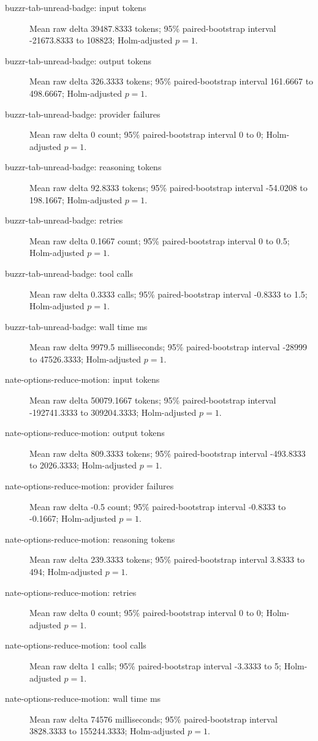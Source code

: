 \begin{description}
\item[buzzr-tab-unread-badge: input tokens] Mean raw delta 39487.8333 tokens; 95\% paired-bootstrap interval -21673.8333 to 108823; Holm-adjusted $p=1$.
\item[buzzr-tab-unread-badge: output tokens] Mean raw delta 326.3333 tokens; 95\% paired-bootstrap interval 161.6667 to 498.6667; Holm-adjusted $p=1$.
\item[buzzr-tab-unread-badge: provider failures] Mean raw delta 0 count; 95\% paired-bootstrap interval 0 to 0; Holm-adjusted $p=1$.
\item[buzzr-tab-unread-badge: reasoning tokens] Mean raw delta 92.8333 tokens; 95\% paired-bootstrap interval -54.0208 to 198.1667; Holm-adjusted $p=1$.
\item[buzzr-tab-unread-badge: retries] Mean raw delta 0.1667 count; 95\% paired-bootstrap interval 0 to 0.5; Holm-adjusted $p=1$.
\item[buzzr-tab-unread-badge: tool calls] Mean raw delta 0.3333 calls; 95\% paired-bootstrap interval -0.8333 to 1.5; Holm-adjusted $p=1$.
\item[buzzr-tab-unread-badge: wall time ms] Mean raw delta 9979.5 milliseconds; 95\% paired-bootstrap interval -28999 to 47526.3333; Holm-adjusted $p=1$.
\item[nate-options-reduce-motion: input tokens] Mean raw delta 50079.1667 tokens; 95\% paired-bootstrap interval -192741.3333 to 309204.3333; Holm-adjusted $p=1$.
\item[nate-options-reduce-motion: output tokens] Mean raw delta 809.3333 tokens; 95\% paired-bootstrap interval -493.8333 to 2026.3333; Holm-adjusted $p=1$.
\item[nate-options-reduce-motion: provider failures] Mean raw delta -0.5 count; 95\% paired-bootstrap interval -0.8333 to -0.1667; Holm-adjusted $p=1$.
\item[nate-options-reduce-motion: reasoning tokens] Mean raw delta 239.3333 tokens; 95\% paired-bootstrap interval 3.8333 to 494; Holm-adjusted $p=1$.
\item[nate-options-reduce-motion: retries] Mean raw delta 0 count; 95\% paired-bootstrap interval 0 to 0; Holm-adjusted $p=1$.
\item[nate-options-reduce-motion: tool calls] Mean raw delta 1 calls; 95\% paired-bootstrap interval -3.3333 to 5; Holm-adjusted $p=1$.
\item[nate-options-reduce-motion: wall time ms] Mean raw delta 74576 milliseconds; 95\% paired-bootstrap interval 3828.3333 to 155244.3333; Holm-adjusted $p=1$.

\end{description}
